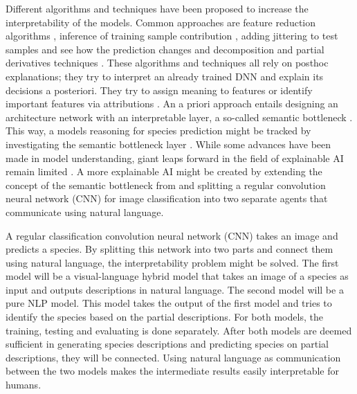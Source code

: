 \documentclass[a4paper, 12pt, oneside]{book} %
\begin{document}
Different algorithms and techniques have been proposed to increase the interpretability of the models.
Common approaches are feature reduction algorithms \autocite{ribeiro_why_2016}, inference of training sample contribution \autocite{koh_understanding_2020}, adding jittering to test samples and see how the prediction changes \autocite{li_understanding_2017} and decomposition and partial derivatives techniques \autocite{samek_explainable_2017}.
These algorithms and techniques all rely on posthoc explanations; they try to interpret an already trained DNN and explain its decisions a posteriori.
They try to assign meaning to features \autocite{fleet_visualizing_2014} or identify important features via attributions \autocite{zintgraf_visualizing_2017, selvaraju_grad-cam_2017}.
An a priori approach entails designing an architecture network with an interpretable layer, a so-called semantic bottleneck \autocite{bucher_semantic_2019}. 
This way, a models reasoning for species prediction might be tracked by investigating the semantic bottleneck layer \autocite{ishikawa_contextual_2021, losch_interpretability_2019}.
While some advances have been made in model understanding, giant leaps forward in the field of explainable AI remain limited \autocite{lipton_mythos_2017, li_interpretable_2021}.
A more explainable AI might be created by extending the concept of the semantic bottleneck from \textcite{ishikawa_contextual_2021} and splitting a regular convolution neural network (CNN) for image classification into two separate agents that communicate using natural language.

A regular classification convolution neural network (CNN) takes an image and predicts a species.
By splitting this network into two parts and connect them using natural language, the interpretability problem might be solved.
The first model will be a visual-language hybrid model that takes an image of a species as input and outputs descriptions in natural language.
The second model will be a pure NLP model.
This model takes the output of the first model and tries to identify the species based on the partial descriptions.
For both models, the training, testing and evaluating is done separately. 
After both models are deemed sufficient in generating species descriptions and predicting species on partial descriptions, they will be connected.
Using natural language as communication between the two models makes the intermediate results easily interpretable for humans.
\end{document}
